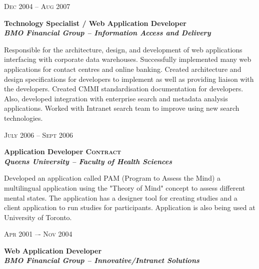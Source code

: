 \documentclass[9pt]{article} %
\begin{document}
{\begin{minipage}[t]{0.5\textwidth}

{\raggedleft\textsc{Dec 2004 -- Aug 2007}\par}

{\raggedright\bf Technology Specialist / Web Application Developer\\
{\it BMO Financial Group – Information Access and Delivery}\\}

\normalsize{Responsible for the architecture, design, and development of web applications interfacing with corporate data warehouses. Successfully implemented many web applications for contact centres and online banking. Created architecture and design specifications for developers to implement as well as providing liaison with the developers. Created CMMI standardisation documentation for developers. Also, developed integration with enterprise search and metadata analysis applications. Worked with Intranet search team to improve using new search technologies.}\\


{\raggedleft\textsc{July 2006 – Sept 2006}\par}

{\raggedright\bf Application Developer \textsc{Contract}\\
{\it Queens University – Faculty of Health Sciences}\\}

\normalsize{Developed an application called PAM (Program to Assess the Mind) a multilingual application using the "Theory of Mind" concept to assess different mental states. The application has a designer tool for creating studies and a client application to run studies for participants. 
Application is also being used at University of Toronto.}\\


{\raggedleft\textsc{Apr 2001 –- Nov 2004}\par}

{\raggedright\bf Web Application Developer\\
{\it BMO Financial Group – Innovative/Intranet Solutions}\\}


\end{minipage}}
\end{document}
